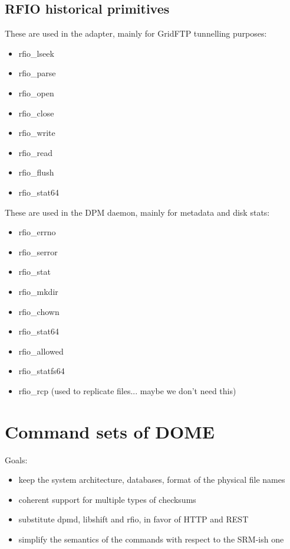 \documentclass[a4paper,10pt]{scrreprt}
\begin{document}
\subsection{RFIO historical primitives}
 
 These are used in the adapter, mainly for GridFTP tunnelling purposes:\\
 
\begin{itemize}
\item rfio\_lseek
\item rfio\_parse
\item rfio\_open
\item rfio\_close
\item rfio\_write
\item rfio\_read
\item rfio\_flush
\item rfio\_stat64
\end{itemize}

 
 These are used in the DPM daemon, mainly for metadata and disk stats:\\
 
\begin{itemize}
\item rfio\_errno
\item rfio\_serror
\item rfio\_stat
\item rfio\_mkdir
\item rfio\_chown
\item rfio\_stat64
\item rfio\_allowed
\item rfio\_statfs64
\item rfio\_rcp (used to replicate files... maybe we don't need this)
\end{itemize}

 
\section{Command sets of DOME}
Goals:

\begin{itemize}
\item keep the system architecture, databases, format of the physical file names
\item coherent support for multiple types of checksums
\item substitute dpmd, libshift and rfio, in favor of HTTP and REST
\item simplify the semantics of the commands with respect to the SRM-ish one
\end{itemize}
\end{document}
